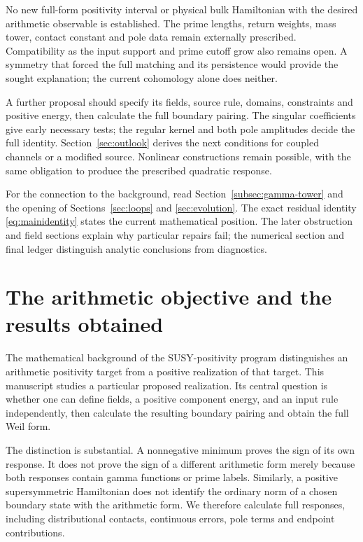 \documentclass[11pt]{article}
\numberwithin{equation}{section}
\theoremstyle{definition}
\theoremstyle{remark}
\begin{document}
No new full-form positivity interval or physical bulk Hamiltonian with the desired arithmetic observable is established. The prime lengths, return weights, mass tower, contact constant and pole data remain externally prescribed. Compatibility as the input support and prime cutoff grow also remains open. A symmetry that forced the full matching and its persistence would provide the sought explanation; the current cohomology alone does neither.

A further proposal should specify its fields, source rule, domains, constraints and positive energy, then calculate the full boundary pairing. The singular coefficients give early necessary tests; the regular kernel and both pole amplitudes decide the full identity. Section~\ref{sec:outlook} derives the next conditions for coupled channels or a modified source. Nonlinear constructions remain possible, with the same obligation to produce the prescribed quadratic response.

For the connection to the background, read Section~\ref{subsec:gamma-tower} and the opening of Sections~\ref{sec:loops} and \ref{sec:evolution}. The exact residual identity \eqref{eq:mainidentity} states the current mathematical position. The later obstruction and field sections explain why particular repairs fail; the numerical section and final ledger distinguish analytic conclusions from diagnostics.

\clearpage

\section{The arithmetic objective and the results obtained}
\label{sec:objective}
The mathematical background of the SUSY-positivity program \cite{background} distinguishes an arithmetic positivity target from a positive realization of that target. This manuscript studies a particular proposed realization. Its central question is whether one can define fields, a positive component energy, and an input rule independently, then calculate the resulting boundary pairing and obtain the full Weil form.

The distinction is substantial. A nonnegative minimum proves the sign of its own response. It does not prove the sign of a different arithmetic form merely because both responses contain gamma functions or prime labels. Similarly, a positive supersymmetric Hamiltonian does not identify the ordinary norm of a chosen boundary state with the arithmetic form. We therefore calculate full responses, including distributional contacts, continuous errors, pole terms and endpoint contributions.
\end{document}
